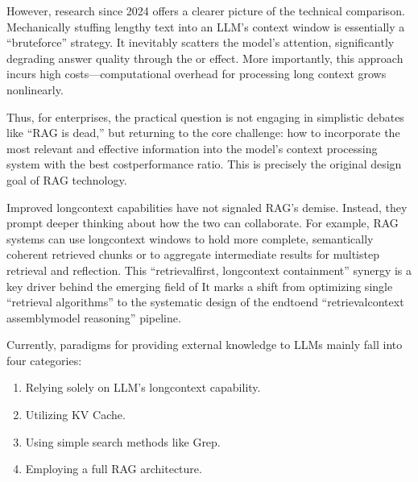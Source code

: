\documentclass[letterpaper,10pt,english]{sphinxmanual}
\begin{document}
\sphinxAtStartPar
However, research since 2024 offers a clearer picture of the technical
comparison. Mechanically stuffing lengthy text into an LLM’s context
window is essentially a “brute\sphinxhyphen{}force” strategy. It inevitably scatters
the model’s attention, significantly degrading answer quality through
the  or  effect. More
importantly, this approach incurs high costs—computational overhead for
processing long context grows non\sphinxhyphen{}linearly.

\sphinxAtStartPar
Thus, for enterprises, the practical question is not engaging in
simplistic debates like “RAG is dead,” but returning to the core
challenge: how to incorporate the most relevant and effective
information into the model’s context processing system with the best
cost\sphinxhyphen{}performance ratio. This is precisely the original design goal of
RAG technology.

\sphinxAtStartPar
Improved long\sphinxhyphen{}context capabilities have not signaled RAG’s demise.
Instead, they prompt deeper thinking about how the two can collaborate.
For example, RAG systems can use long\sphinxhyphen{}context windows to hold more
complete, semantically coherent retrieved chunks or to aggregate
intermediate results for multi\sphinxhyphen{}step retrieval and reflection. This
“retrieval\sphinxhyphen{}first, long\sphinxhyphen{}context containment” synergy is a key driver
behind the emerging field of  It marks a shift
from optimizing single “retrieval algorithms” to the systematic design
of the end\sphinxhyphen{}to\sphinxhyphen{}end “retrieval\sphinxhyphen{}context assembly\sphinxhyphen{}model reasoning” pipeline.

\sphinxAtStartPar
Currently, paradigms for providing external knowledge to LLMs mainly
fall into four categories:
\begin{enumerate}
%
\item {} 
\sphinxAtStartPar
Relying solely on LLM’s long\sphinxhyphen{}context capability.

\item {} 
\sphinxAtStartPar
Utilizing KV Cache.

\item {} 
\sphinxAtStartPar
Using simple search methods like Grep.

\item {} 
\sphinxAtStartPar
Employing a full RAG architecture.

\end{enumerate}
\end{document}
